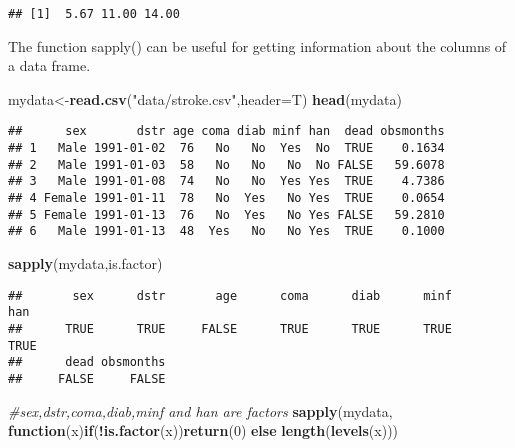 \documentclass[]{book}
\newenvironment{Shaded}{\begin{snugshade}}{\end{snugshade}}
\newcommand{\KeywordTok}[1]{\textcolor[rgb]{0.13,0.29,0.53}{\textbf{#1}}}
\newcommand{\DataTypeTok}[1]{\textcolor[rgb]{0.13,0.29,0.53}{#1}}
\newcommand{\DecValTok}[1]{\textcolor[rgb]{0.00,0.00,0.81}{#1}}
\newcommand{\StringTok}[1]{\textcolor[rgb]{0.31,0.60,0.02}{#1}}
\newcommand{\CommentTok}[1]{\textcolor[rgb]{0.56,0.35,0.01}{\textit{#1}}}
\newcommand{\ControlFlowTok}[1]{\textcolor[rgb]{0.13,0.29,0.53}{\textbf{#1}}}
\newcommand{\OperatorTok}[1]{\textcolor[rgb]{0.81,0.36,0.00}{\textbf{#1}}}
\newcommand{\NormalTok}[1]{#1}
\theoremstyle{definition}
\theoremstyle{definition}
\theoremstyle{definition}
\theoremstyle{remark}
\begin{document}
\begin{verbatim}
## [1]  5.67 11.00 14.00
\end{verbatim}

The function sapply() can be useful for getting information about the
columns of a data frame.

\begin{Shaded}
\begin{Highlighting}[]
\NormalTok{mydata<-}\KeywordTok{read.csv}\NormalTok{(}\StringTok{"data/stroke.csv"}\NormalTok{,}\DataTypeTok{header=}\NormalTok{T)}
\KeywordTok{head}\NormalTok{(mydata)}
\end{Highlighting}
\end{Shaded}

\begin{verbatim}
##      sex       dstr age coma diab minf han  dead obsmonths
## 1   Male 1991-01-02  76   No   No  Yes  No  TRUE    0.1634
## 2   Male 1991-01-03  58   No   No   No  No FALSE   59.6078
## 3   Male 1991-01-08  74   No   No  Yes Yes  TRUE    4.7386
## 4 Female 1991-01-11  78   No  Yes   No Yes  TRUE    0.0654
## 5 Female 1991-01-13  76   No  Yes   No Yes FALSE   59.2810
## 6   Male 1991-01-13  48  Yes   No   No Yes  TRUE    0.1000
\end{verbatim}

\begin{Shaded}
\begin{Highlighting}[]
\KeywordTok{sapply}\NormalTok{(mydata,is.factor)}
\end{Highlighting}
\end{Shaded}

\begin{verbatim}
##       sex      dstr       age      coma      diab      minf       han 
##      TRUE      TRUE     FALSE      TRUE      TRUE      TRUE      TRUE 
##      dead obsmonths 
##     FALSE     FALSE
\end{verbatim}

\begin{Shaded}
\begin{Highlighting}[]
\CommentTok{#sex,dstr,coma,diab,minf and han are factors}
\KeywordTok{sapply}\NormalTok{(mydata, }\ControlFlowTok{function}\NormalTok{(x)}\ControlFlowTok{if}\NormalTok{(}\OperatorTok{!}\KeywordTok{is.factor}\NormalTok{(x))}\KeywordTok{return}\NormalTok{(}\DecValTok{0}\NormalTok{) }\ControlFlowTok{else} \KeywordTok{length}\NormalTok{(}\KeywordTok{levels}\NormalTok{(x)))}
\end{Highlighting}
\end{Shaded}
\end{document}

